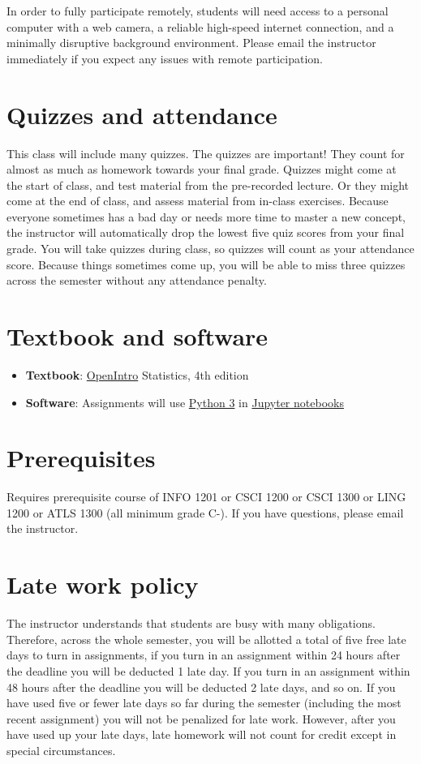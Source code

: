 \documentclass[10pt]{memoir}
\begin{document}
In order to fully participate remotely, students will need access to a personal computer with a web camera, a reliable high-speed internet connection, and a minimally disruptive background environment. Please email the instructor immediately if you expect any issues with remote participation.

\section{\textbf{Quizzes and attendance}}

This class will include many quizzes. The quizzes are important! They count for almost as much as homework towards your final grade. Quizzes might come at the start of class, and test material from the pre-recorded lecture. Or they might come at the end of class, and assess material from in-class exercises. Because everyone sometimes has a bad day or needs more time to master a new concept, the instructor will automatically drop the lowest five quiz scores from your final grade. You will take quizzes during class, so quizzes will count as your attendance score. Because things sometimes come up, you will be able to miss three quizzes across the semester without any attendance penalty. 

\section{\textbf{Textbook and software }}

\begin{itemize}
\item \textbf{Textbook}: \href{https://www.abehandler.com/resources/openintro-statistics.pdf}{OpenIntro} Statistics, 4th edition
\item \textbf{Software}: Assignments will use \href{https://www.python.org/}{Python 3} in \href{https://jupyter.org/}{Jupyter notebooks}
\end{itemize}

\section{\textbf{Prerequisites}}

Requires prerequisite course of INFO 1201 or CSCI 1200 or CSCI 1300 or LING 1200 or ATLS 1300 (all minimum grade C-). If you have questions, please email the instructor.

\section{\textbf{Late work policy}}
The instructor understands that students are busy with many obligations. Therefore, across the whole semester, you will be allotted a total of five free late days to turn in assignments, if you turn in an assignment within 24 hours after the deadline you will be deducted 1 late day. If you turn in an assignment within 48 hours after the deadline you will be deducted 2 late days, and so on. If you have used five or fewer late days so far during the semester (including the most recent assignment) you will not be penalized for late work. However, after you have used up your late days, late homework will not count for credit except in special circumstances.
\end{document}
